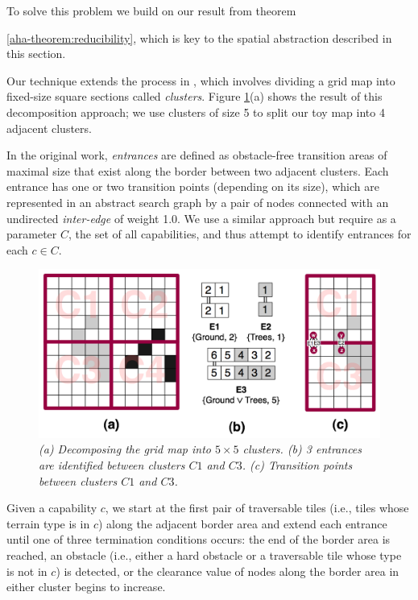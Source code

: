 To solve this problem we build on our result from theorem {\ref{aha-theorem:reducibility}, which is key to the spatial abstraction described in this section.
\par \indent
Our technique extends the process in \cite{botea04}, which involves dividing a grid map into fixed-size square sections called \emph{clusters}. 
Figure \ref{aha-fig:clustersandentrances}(a) shows the result of this decomposition approach; we use clusters of size 5 to split our toy map into 4 adjacent clusters. 
\par \indent
In the original work, \emph{entrances} are defined as obstacle-free transition areas of maximal size that exist along the border between two adjacent clusters.
Each entrance has one or two transition points (depending on its size), which are represented in an abstract search graph by a pair of nodes connected with an undirected \emph{inter-edge} of weight 1.0. 
We use a similar approach but require as a parameter $C$, the set of all capabilities, and thus attempt to identify entrances for each $c \in C$. 
\begin{figure}[htbp]
	\vspace{-9pt}
        \caption{\emph{(a) Decomposing the grid map into $5 \times 5$ clusters. (b) 3 entrances are identified between clusters $C1$ and $C3$. (c) Transition points between clusters $C1$ and $C3$.} \vspace{0.5em} }
        \begin{center}
                        \includegraphics[scale=0.30, trim = 20mm 0mm 20mm 0mm]{diagrams/identifying_entrances.png}
        \end{center}
        \label{aha-fig:clustersandentrances}
	\vspace{-9pt}
\end{figure}
\par \indent
Given a capability $c$,
we start at the first pair of traversable tiles (i.e., tiles whose terrain type is in $c$) along the adjacent border area and extend each entrance until one of three termination conditions occurs: the end of the border area is reached, an obstacle (i.e., either a hard obstacle or a traversable tile whose type is not in $c$) is detected, or the clearance value of nodes along the border area in either cluster begins to increase. 
}
